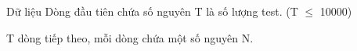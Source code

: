 Dữ liệu
Dòng đầu tiên chứa số nguyên T là số lượng test. (T  $\le$  10000)  

   T dòng tiếp theo, mỗi dòng chứa một số nguyên N.